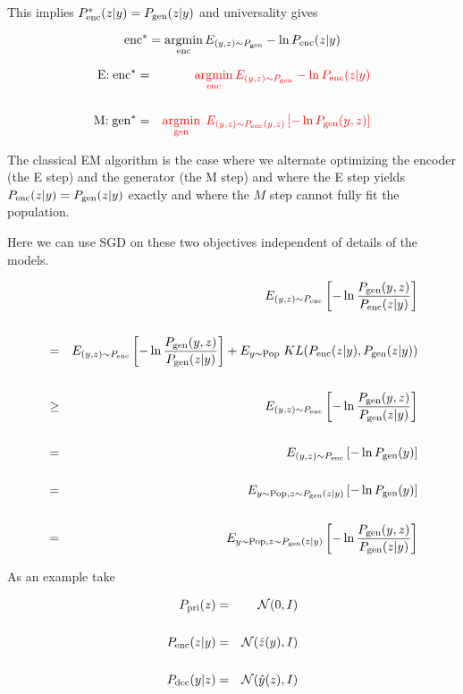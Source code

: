 {\vfill
This implies $P_{\mathrm{enc}}^*(z|y) = P_{\mathrm{gen}}(z|y)$ and universality gives


{\color{red} $$\mathrm{enc}^* = \operatorname*{argmin}_{\mathrm{enc}} E_{(y,z) \sim P_{\mathrm{gen}}} -\ln P_{\mathrm{enc}}(z|y)$$}


\begin{eqnarray*}
\mbox{E:}\;\mathrm{enc}^* & = & {\color{red} \operatorname*{argmin}_{\mathrm{enc}} E_{(y,z) \sim P_{\mathrm{gen}}} -\ln P_{\mathrm{enc}}(z|y)} \\
\\
\mbox{M:}\;\mathrm{gen}^* & =& {\color{red} \operatorname*{argmin}_{\mathrm{gen}}\;E_{(y,z) \sim P_{\mathrm{enc}}(y,z)}\left[-\ln P_{\mathrm{gen}}(y,z)\right]}
\end{eqnarray*}

\vfill
The classical EM algorithm is the case where we alternate optimizing the encoder (the E step)
and the generator (the M step) and where the E step yields $P_{\mathrm{enc}}(z|y) = P_{\mathrm{gen}}(z|y)$ exactly
and where the $M$ step cannot fully fit the population.

\vfill
Here we can use SGD on these two objectives
independent of details of the models.


{\color{red} \Large
\begin{eqnarray*}
& & E_{(y,z) \sim P_{\mathrm{enc}}}\left[ - \ln \frac{P_{\mathrm{gen}}(y,z)}{P_{\mathrm{enc}}(z|y)}\right] \\
\\
& = & E_{(y,z) \sim P_{\mathrm{enc}}}\left[ - \ln \frac{P_{\mathrm{gen}}(y,z)}{P_{\mathrm{gen}}(z|y)}\right] + E_{y \sim \mathrm{Pop}} \;KL(P_{\mathrm{enc}}(z|y),P_{\mathrm{gen}}(z|y)) \\
\\
& \geq & E_{(y,z) \sim P_{\mathrm{enc}}}\left[ - \ln \frac{P_{\mathrm{gen}}(y,z)}{P_{\mathrm{gen}}(z|y)}\right] \\
\\
& = & E_{(y,z) \sim P_{\mathrm{enc}}}\left[ - \ln P_{\mathrm{gen}}(y)\right] \\
\\
& = & E_{y \sim \mathrm{Pop},z \sim P_{\mathrm{gen}}(z|y)}\left[ - \ln P_{\mathrm{gen}}(y) \right]\\
\\
& = & E_{y \sim \mathrm{Pop},z \sim P_{\mathrm{gen}}(z|y)}\left[ - \ln \frac{P_{\mathrm{gen}}(y,z)}{P_{\mathrm{gen}}(z|y)}\right]
\end{eqnarray*}
}







As an example take

\begin{eqnarray*}
P_{\mathrm{pri}}(z) & = & {\cal N}(0,I) \\
\\
P_{\mathrm{enc}}(z|y) & = & {\cal N}(\hat{z}(y),I) \\
\\
P_{\mathrm{dec}}(y|z) & = & {\cal N}(\hat{y}(z),I)
\end{eqnarray*}

}

